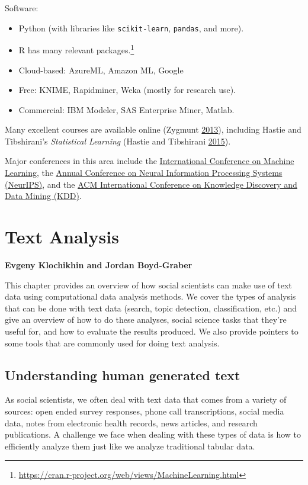 \documentclass[]{krantz}
\begin{document}
Software:

\begin{itemize}
\item
  Python (with libraries like \texttt{scikit-learn}, \texttt{pandas},
  and more).
\item
  R has many relevant packages.\footnote{\url{https://cran.r-project.org/web/views/MachineLearning.html}}
\item
  Cloud-based: AzureML, Amazon ML, Google
\item
  Free: KNIME, Rapidminer, Weka (mostly for research use).
\item
  Commercial: IBM Modeler, SAS Enterprise Miner, Matlab.
\end{itemize}

Many excellent courses are available online (Zygmunt
\protect\hyperlink{ref-MLcourses}{2013}), including Hastie and
Tibshirani's \emph{Statistical Learning} (Hastie and Tibshirani
\protect\hyperlink{ref-SLcourse}{2015}).

Major conferences in this area include the
\href{https://icml.cc/}{International Conference on Machine Learning},
the \href{https://nips.cc/}{Annual Conference on Neural Information
Processing Systems (NeurIPS)}, and the \href{https://www.kdd.org/}{ACM
International Conference on Knowledge Discovery and Data Mining (KDD)}.

\hypertarget{chap:text}{\chapter{Text Analysis}\label{chap:text}}

\textbf{Evgeny Klochikhin and Jordan Boyd-Graber}

This chapter provides an overview of how social scientists can make use
of text data using computational data analysis methods. We cover the
types of analysis that can be done with text data (search, topic
detection, classification, etc.) and give an overview of how to do these
analyses, social science tasks that they're useful for, and how to
evaluate the results produced. We also provide pointers to some tools
that are commonly used for doing text analysis.

\section{Understanding human generated
text}\label{understanding-human-generated-text}

As social scientists, we often deal with text data that comes from a
variety of sources: open ended survey responses, phone call
transcriptions, social media data, notes from electronic health records,
news articles, and research publications. A challenge we face when
dealing with these types of data is how to efficiently analyze them just
like we analyze traditional tabular data.
\end{document}
